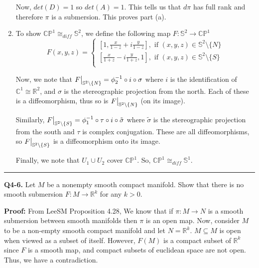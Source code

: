 \documentclass{article}
\newcommand{\R}{\mathbb{R}}
\newcommand{\C}{\mathbb{C}}
\newcommand{\restr}[2]{{%
  \left.\kern-\nulldelimiterspace %
  #1 %
  \vphantom{\big|} %
  \right|_{#2} %
  }}
\begin{document}
\begin{enumerate}[label=(\alph*)]
  Now, $det(D) = 1$ so $det(A) = 1$. This tells us that $d\pi$ has full rank and therefore $\pi$ is a submersion. This proves part (a).

  \vskip 0.5cm
  \item To show $\mathbb{CP}^{1} \cong_{diff} \mathbb{S}^2$, we define the following map $F : \mathbb{S}^2 \rightarrow \mathbb{CP}^{1}$
  \[  F(x, y, z) = \begin{cases}
    [ 1, \frac{x}{1-z} + i\frac{y}{1-z}], \text{ if }(x, y, z) \in \mathbb{S}^2 \setminus \{N\} \\
    [\frac{x}{1+z} - i\frac{y}{1+z}, 1], \text{ if }(x, y, z) \in \mathbb{S}^2 \setminus \{S\} \\
  \end{cases}  \]

  \vskip 0.5cm
  Now, we note that $\restr{F}{\mathbb{S}^2 \setminus \{N\}} = \phi_2^{-1} \circ i \circ \sigma$ where $i$ is the identification of $\C^1 \cong \R^2$, and $\sigma$ is the stereographic projection from the north. Each of these is a diffeomorphism, thus so is $\restr{F}{\mathbb{S}^2 \setminus \{N\}}$ (on its image). 
  
  \vskip 0.25cm
  Similarly, $\restr{F}{\mathbb{S}^2 \setminus \{S\}}= \phi_1^{-1} \circ \tau \circ i \circ \tilde{\sigma}$ where $\tilde{\sigma}$ is the stereographic projection from the south and $\tau$ is complex conjugation. These are all diffeomorphisms, so $\restr{F}{\mathbb{S}^2 \setminus \{S\}}$ is a diffeomorphism onto its image.  

  \vskip 0.25cm
  Finally, we note that $U_1 \cup U_2$ cover $\mathbb{CP}^1$. So,
  $\mathbb{CP}^1 \cong_{diff} \mathbb{S}^1$. 
\end{enumerate}


\vskip 0.5cm
\hrule 
\vskip 0.5cm



\textbf{Q4-6.} Let $M$ be a nonempty smooth compact manifold. Show that there is no smooth submersion $F : M \rightarrow \R^{k}$ for any $k > 0$. 

\vskip 0.5cm
\textbf{Proof:}
From LeeSM Proposition 4.28, We know that if $\pi : M \rightarrow N$ is a smooth submersion between smooth manifolds then $\pi$ is an open map. Now, consider $M$ to be a non-empty smooth compact manifold and let $N = \R^k$. $M \subseteq M$ is open when viewed as a subset of itself. However, $F(M)$ is a compact subset of $\R^k$ since $F$ is a smooth map, and compact subsets of euclidean space are not open. Thus, we have a contradiction.
\end{document}
